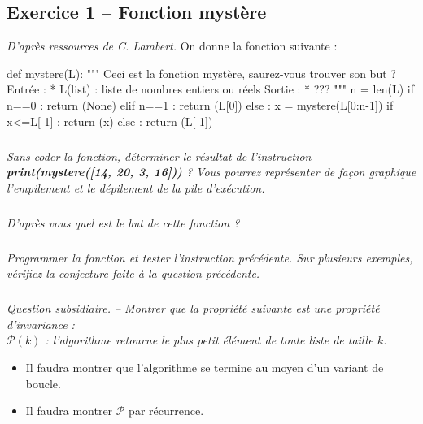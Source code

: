 
\subsection*{Exercice 1 -- Fonction mystère}

\ifprof
\else
\textit{D'après ressources de C. Lambert.}
On donne la fonction suivante : 
\begin{py}
\begin{python}
def mystere(L):
    """
    Ceci est la fonction mystère, saurez-vous 
    trouver son but ?
    Entrée : 
        * L(list) : liste de nombres entiers
    ou réels
    Sortie : 
        * ??? 
    """
    n = len(L)
    if n==0 :
        return (None)
    elif n==1 :
        return (L[0])
    else :
        x = mystere(L[0:n-1])
        if x<=L[-1] :
            return (x)
        else : 
            return (L[-1])
\end{python}
\end{py}
\subparagraph{}
\textit{Sans coder la fonction, déterminer le résultat de l'instruction \textbf{print(mystere([14, 20, 3, 16]))} ? Vous 
pourrez représenter de façon graphique l'empilement et le dépilement de la pile d'exécution.}

\subparagraph{}
\textit{D'après vous quel est le but de cette fonction ?}

\subparagraph{}
\textit{Programmer la fonction et tester l'instruction précédente. Sur plusieurs exemples, vérifiez la conjecture faite à la question précédente.}

\subparagraph{}
\textit{Question subsidiaire. -- Montrer que la propriété suivante est une propriété d'invariance :\\
$\mathcal{P}(k)$ : l'algorithme retourne le plus petit élément de toute liste de taille $k$.}

\begin{rem}
\begin{itemize}
\item Il faudra montrer que l'algorithme se termine au moyen d'un variant de boucle. 
\item Il faudra montrer $\mathcal{P}$ par récurrence. 
\end{itemize}
\end{rem}
\fi

